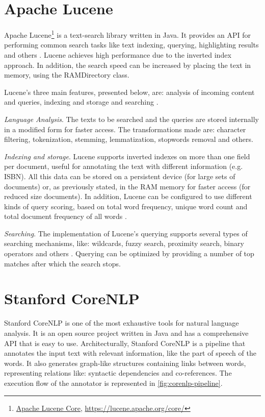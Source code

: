 \section{Apache Lucene}
\label{sec:lucene}

Apache Lucene\footnote{\href{https://lucene.apache.org/core/}{Apache Lucene Core}, \url{https://lucene.apache.org/core/}} is a text-search library written in Java. It provides an API for performing common search tasks like text indexing, querying, highlighting results and others \cite{Biaecki2012}. Lucene achieves high performance due to the inverted index \cite{VanRijsbergen1979} approach. In addition, the search speed can be increased by placing the text in memory, using the RAMDirectory class.

Lucene's three main features, presented below, are: analysis of incoming content and queries, indexing and storage and searching \cite{Biaecki2012}.

{\em Language Analysis}. The texts to be searched and the queries are stored internally in a modified form for faster access. The transformations made are: character filtering, tokenization, stemming, lemmatization, stopwords removal and others.

{\em Indexing and storage}. Lucene supports inverted indexes on more than one field per document, useful for annotating the text with different information (e.g. ISBN). All this data can be stored on a persistent device (for large sets of documents) or, as previously stated, in the RAM memory for faster access (for reduced size documents). In addition, Lucene can be configured to use different kinds of query scoring, based on total word frequency, unique word count and total document frequency of all words \cite{Biaecki2012}.

{\em Searching}. The implementation of Lucene's querying supports several types of searching mechanisms, like: wildcards, fuzzy search, proximity search, binary operators and others \cite{Biaecki2012}. Querying can be optimized by providing a number of top matches after which the search stops.

\section{Stanford CoreNLP}
\label{sec:corenlp}

Stanford CoreNLP is one of the most exhaustive tools for natural language analysis. It is an open source project written in Java and has a comprehensive API that is easy to use. Architecturally, Stanford CoreNLP is a pipeline that annotates the input text with relevant information, like the part of speech of the words. It also generates graph-like structures containing links between words, representing relations like: syntactic dependencies and co-references. The execution flow of the annotator is represented in \autoref{fig:corenlp-pipeline}.

